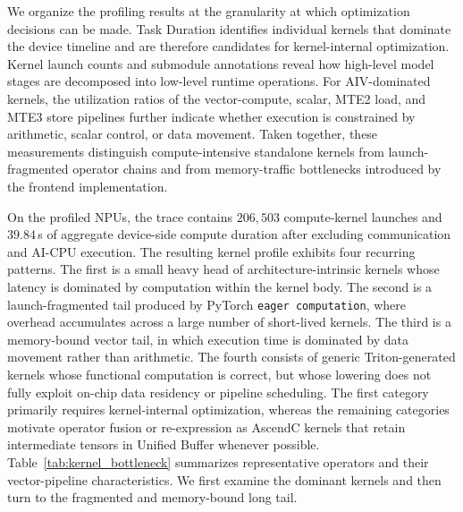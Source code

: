 We organize the profiling results at the granularity at which optimization decisions can be made. Task Duration identifies individual kernels that dominate the device timeline and are therefore candidates for kernel-internal optimization. Kernel launch counts and submodule annotations reveal how high-level model stages are decomposed into low-level runtime operations. For AIV-dominated kernels, the utilization ratios of the vector-compute, scalar, MTE2 load, and MTE3 store pipelines further indicate whether execution is constrained by arithmetic, scalar control, or data movement. Taken together, these measurements distinguish compute-intensive standalone kernels from launch-fragmented operator chains and from memory-traffic bottlenecks introduced by the frontend implementation.

On the profiled NPUs, the trace contains $206{,}503$ compute-kernel launches and $39.84$\,s of aggregate device-side compute duration after excluding communication and AI-CPU execution. The resulting kernel profile exhibits four recurring patterns. The first is a small heavy head of architecture-intrinsic kernels whose latency is dominated by computation within the kernel body. The second is a launch-fragmented tail produced by PyTorch \texttt{eager computation}, where overhead accumulates across a large number of short-lived kernels. The third is a memory-bound vector tail, in which execution time is dominated by data movement rather than arithmetic. The fourth consists of generic Triton-generated kernels whose functional computation is correct, but whose lowering does not fully exploit on-chip data residency or pipeline scheduling. The first category primarily requires kernel-internal optimization, whereas the remaining categories motivate operator fusion or re-expression as AscendC kernels that retain intermediate tensors in Unified Buffer whenever possible. Table~\ref{tab:kernel_bottleneck} summarizes representative operators and their vector-pipeline characteristics. We first examine the dominant kernels and then turn to the fragmented and memory-bound long tail.





